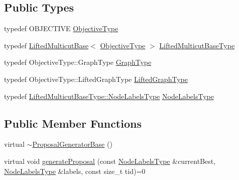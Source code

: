 \subsection*{Public Types}
\begin{DoxyCompactItemize}
\item 
typedef O\+B\+J\+E\+C\+T\+I\+VE \hyperlink{classnifty_1_1graph_1_1opt_1_1lifted__multicut_1_1ProposalGeneratorBase_a3f3357da90c9bc1ea4448689a822c40c}{Objective\+Type}
\item 
typedef \hyperlink{classnifty_1_1graph_1_1opt_1_1lifted__multicut_1_1LiftedMulticutBase}{Lifted\+Multicut\+Base}$<$ \hyperlink{classnifty_1_1graph_1_1opt_1_1lifted__multicut_1_1ProposalGeneratorBase_a3f3357da90c9bc1ea4448689a822c40c}{Objective\+Type} $>$ \hyperlink{classnifty_1_1graph_1_1opt_1_1lifted__multicut_1_1ProposalGeneratorBase_acc6ee5fcd623bc2452236261aff9988f}{Lifted\+Multicut\+Base\+Type}
\item 
typedef Objective\+Type\+::\+Graph\+Type \hyperlink{classnifty_1_1graph_1_1opt_1_1lifted__multicut_1_1ProposalGeneratorBase_ad34a7770fa431e6e52e55f3e1adc0443}{Graph\+Type}
\item 
typedef Objective\+Type\+::\+Lifted\+Graph\+Type \hyperlink{classnifty_1_1graph_1_1opt_1_1lifted__multicut_1_1ProposalGeneratorBase_af8b793c8b9e5cf71b08f74c1d30c89ae}{Lifted\+Graph\+Type}
\item 
typedef \hyperlink{classnifty_1_1graph_1_1opt_1_1common_1_1SolverBase_abefd51561de2fd009f6bed6bef6009ea}{Lifted\+Multicut\+Base\+Type\+::\+Node\+Labels\+Type} \hyperlink{classnifty_1_1graph_1_1opt_1_1lifted__multicut_1_1ProposalGeneratorBase_ab102e54a80aba7ed8884d61ae0803954}{Node\+Labels\+Type}
\end{DoxyCompactItemize}
\subsection*{Public Member Functions}
\begin{DoxyCompactItemize}
\item 
virtual \hyperlink{classnifty_1_1graph_1_1opt_1_1lifted__multicut_1_1ProposalGeneratorBase_a3f46f104c21ea861c38a585f3a4aa431}{$\sim$\+Proposal\+Generator\+Base} ()
\item 
virtual void \hyperlink{classnifty_1_1graph_1_1opt_1_1lifted__multicut_1_1ProposalGeneratorBase_ae00635fcec34663a1ec72cac36514e0a}{generate\+Proposal} (const \hyperlink{classnifty_1_1graph_1_1opt_1_1lifted__multicut_1_1ProposalGeneratorBase_ab102e54a80aba7ed8884d61ae0803954}{Node\+Labels\+Type} \&current\+Best, \hyperlink{classnifty_1_1graph_1_1opt_1_1lifted__multicut_1_1ProposalGeneratorBase_ab102e54a80aba7ed8884d61ae0803954}{Node\+Labels\+Type} \&labels, const size\+\_\+t tid)=0
\end{DoxyCompactItemize}


